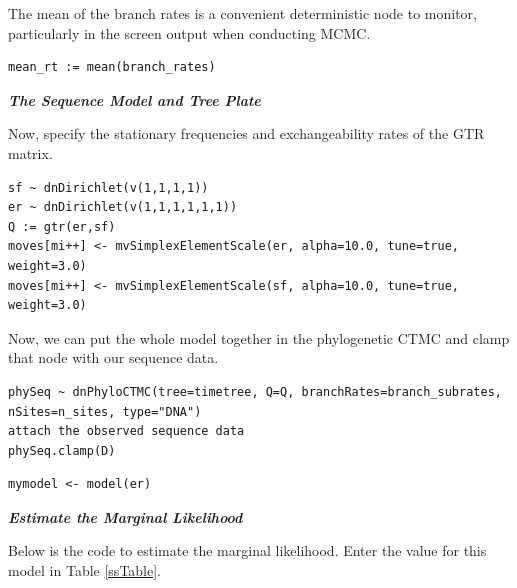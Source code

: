 The mean of the branch rates is a convenient deterministic node to monitor, particularly in the screen output when conducting MCMC.
{\tt \begin{snugshade*}
\begin{lstlisting}
mean_rt := mean(branch_rates) 
\end{lstlisting}
\end{snugshade*}}

\textbf{\textit{The Sequence Model and Tree Plate}}

Now, specify the stationary frequencies and exchangeability rates of the GTR matrix.
{\tt \begin{snugshade*}
\begin{lstlisting}
sf ~ dnDirichlet(v(1,1,1,1))
er ~ dnDirichlet(v(1,1,1,1,1,1))
Q := gtr(er,sf)
moves[mi++] <- mvSimplexElementScale(er, alpha=10.0, tune=true, weight=3.0)
moves[mi++] <- mvSimplexElementScale(sf, alpha=10.0, tune=true, weight=3.0)
\end{lstlisting}
\end{snugshade*}}

Now, we can put the whole model together in the phylogenetic CTMC and clamp that node with our sequence data.
{\tt \begin{snugshade*}
\begin{lstlisting}
phySeq ~ dnPhyloCTMC(tree=timetree, Q=Q, branchRates=branch_subrates, nSites=n_sites, type="DNA")
attach the observed sequence data
phySeq.clamp(D)
\end{lstlisting}
\end{snugshade*}}

{\tt \begin{snugshade*}
\begin{lstlisting}
mymodel <- model(er)
\end{lstlisting}
\end{snugshade*}}


\textbf{\textit{Estimate the Marginal Likelihood}}

Below is the code to estimate the marginal likelihood. 
Enter the value for this model in Table \ref{ssTable}.


